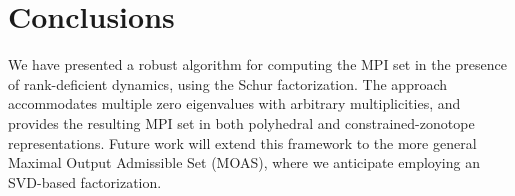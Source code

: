 \documentclass[journal,twoside,web]{ieeecolor}
\begin{document}
\section{Conclusions}
\label{sec:conclusions}


We have presented a robust algorithm for computing the MPI set in the presence of rank-deficient dynamics, using the Schur factorization. The approach accommodates multiple zero eigenvalues with arbitrary multiplicities, and provides the resulting MPI set in both polyhedral and constrained-zonotope representations. Future work will extend this framework to the more general Maximal Output Admissible Set (MOAS), where we anticipate employing an SVD-based factorization.


\end{document}
